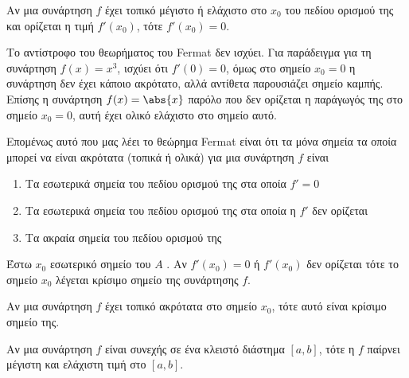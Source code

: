 \begin{thm}[Fermat]
    Αν μια συνάρτηση $f$ έχει τοπικό μέγιστο ή ελάχιστο στο $ x_{0} $ του
    πεδίου ορισμού της και ορίζεται η τιμή $ f'(x_{0}) $, τότε $ f'(x_{0}) = 0 $.
\end{thm}

\begin{rem}
    Το αντίστροφο του θεωρήματος του Fermat δεν ισχύει. Για παράδειγμα για τη συνάρτηση
    $ f(x)=x^{3} $, ισχύει ότι $ f'(0)=0 $, όμως στο σημείο $ x_{0} = 0 $ η συνάρτηση δεν έχει
    κάποιο ακρότατο, αλλά αντίθετα παρουσιάζει σημείο καμπής. Επίσης η συνάρτηση $ f(x) = \abs{x} $
    παρόλο που δεν ορίζεται η παράγωγός της στο σημείο $ x_{0} = 0 $, αυτή έχει ολικό ελάχιστο στο
    σημείο αυτό.
\end{rem}

\begin{rem}
    Επομένως αυτό που μας λέει το θεώρημα Fermat είναι ότι τα μόνα σημεία τα οποία
    μπορεί να είναι ακρότατα (τοπικά ή ολικά) για μια συνάρτηση $f$ είναι 

    \begin{enumerate}
        \item Τα εσωτερικά σημεία του πεδίου ορισμού της στα οποία $ f'=0 $
        \item Τα εσωτερικά σημεία του πεδίου ορισμού της στα οποία η $ f' $ δεν ορίζεται
        \item Τα ακραία σημεία του πεδίου ορισμού της
    \end{enumerate}
\end{rem}


\begin{dfn}
    Έστω $ x_{0} $ εσωτερικό σημείο του $A$ . Αν $ f'(x_{0}) = 0 $ ή $ f'(x_{0}) $ δεν ορίζεται τότε
    το σημείο $ x_{0} $ λέγεται \textcolor{Col1}{κρίσιμο} σημείο της συνάρτησης $f$. 
\end{dfn}




    \begin{prop}
        Αν μια συνάρτηση $f$ έχει τοπικό ακρότατα στο σημείο $ x_{0} $, τότε αυτό είναι κρίσιμο
        σημείο της.
    \end{prop}

    

\begin{thm}
    Αν μια συνάρτηση $f$ είναι συνεχής σε ένα κλειστό διάστημα $ [a,b] $, τότε η $f$
    παίρνει μέγιστη και ελάχιστη τιμή στο $ [a,b] $.
\end{thm}

